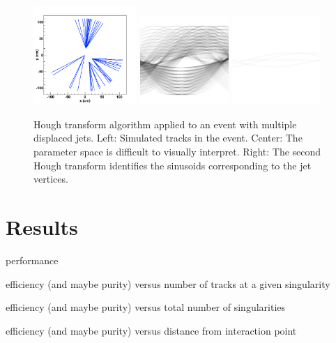 \documentclass{JINST}
\begin{document}
\begin{figure}[!Hhtb]
\begin{center}
	\includegraphics[width=0.35\textwidth]{figs/jet2/tracks.pdf}
	\includegraphics[width=0.30\textwidth]{figs/jet2/accumulator.pdf}
	\includegraphics[width=0.30\textwidth]{figs/jet2/vertex.pdf}
	\caption{Hough transform algorithm applied to an event with multiple displaced jets. Left: Simulated
	tracks in the event. Center: The parameter space is difficult to visually interpret. Right: The
	second Hough transform identifies the sinusoids corresponding to the jet vertices.
	\label{fig:DisplacedJets}}
\end{center}
\end{figure}

\section{Results}

performance

efficiency (and maybe purity) versus number of tracks at a given singularity

efficiency (and maybe purity) versus total number of singularities

efficiency (and maybe purity) versus distance from interaction point
\end{document}
